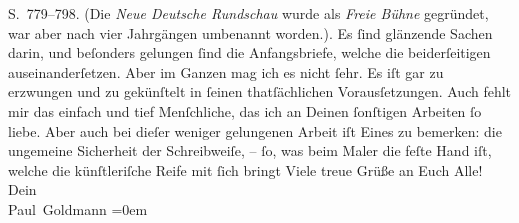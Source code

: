 \begin{ledgroupsized}[t]{13cm}
{{{                     S. 779–798. (Die \emph{Neue Deutsche
                     Rundschau} wurde als \emph{Freie Bühne}
                  gegründet, war aber nach vier Jahrgängen umbenannt worden.)}}}\label{K_L02746-3h}. Es ſind
               glänzende Sachen darin, und beſonders gelungen ſind die Anfangsbriefe, welche die beiderſeitigen
                  \label{K_L02746-4v}\label{K_L02746-4h} auseinanderſetzen. Aber im Ganzen {\pb} mag ich es nicht ſehr. Es iſt gar zu
               erzwungen und zu gekünſtelt in ſeinen thatſächlichen Vorausſetzungen. Auch fehlt mir
               das einfach und tief Menſchliche, das ich an Deinen ſonſtigen Arbeiten ſo liebe. Aber
               auch bei dieſer weniger gelungenen Arbeit iſt Eines zu bemerken: die ungemeine Sicherheit der Schreibweiſe, –
               ſo, was beim Maler die feſte Hand iſt, welche die künſtleriſche Reife mit ſich
                  bringt{\dotstwo}\textcolor{gray}{{\dotstwo}}\pend
           \pstart
           Viele treue Grüße an Euch Alle! {\\[\baselineskip]}Dein {\\[\baselineskip]}\spacefill\mbox{Paul Goldmann}\pend
           \leftskip=0em{}
         
         \endnumbering{}\end{ledgroupsized}  \newcommand{\dateiname}{L02746}\newcommand{\titel}{Paul Goldmann an Arthur Schnitzler, 22. 8. [1895]}\newcommand{\editorInnen}{Martin Anton Müller und Laura Untner}
      